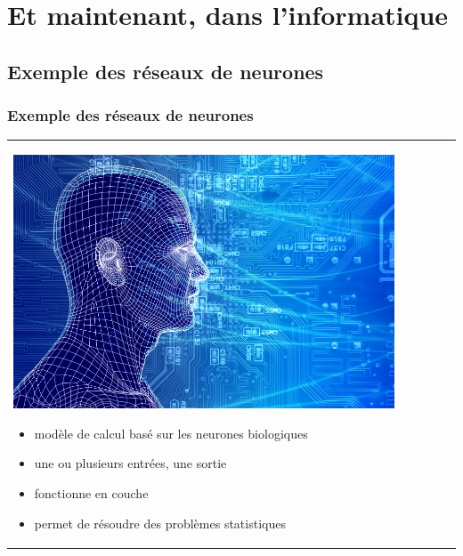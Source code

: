 \documentclass[handout]{beamer}
\begin{document}
	\section{Et maintenant, dans l'informatique}

	\subsection{Exemple des réseaux de neurones}
		\begin{frame}
		\frametitle{Exemple des réseaux de neurones}
		\begin{tabular}{l l}
			\begin{minipage}{0.4\textwidth}
				\begin{center}
					\includegraphics[width=0.9\textwidth]{images/neural_networking.jpg}
				\end{center}
			\end{minipage}

			\begin{minipage}{0.6\textwidth}
				\begin{itemize}
					\item modèle de calcul basé sur les neurones biologiques
					\item une ou plusieurs entrées, une sortie
					\item fonctionne en couche
					\item permet de résoudre des problèmes statistiques
				\end{itemize}
			\end{minipage}
			
		\end{tabular}
		\end{frame}
\end{document}
